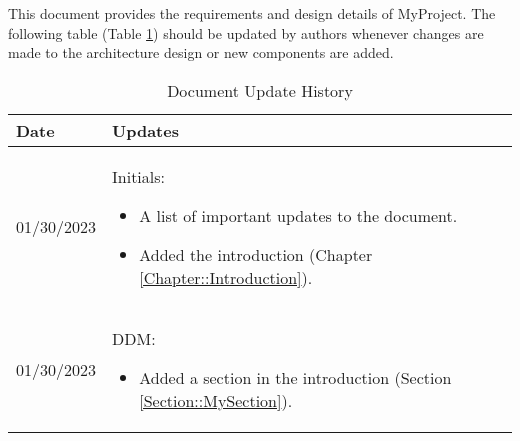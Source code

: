This document provides the requirements and design details of MyProject.  
The following table (Table \ref{Table::UpdateHistory}) should be
updated by authors whenever changes are made to the architecture
design or new components are added.  

\begin{longtable}{|l||p{13.5cm}|}
\caption{Document Update History \label{Table::UpdateHistory}}\\
\hline
\textbf{Date} & \textbf{Updates} \\
\hline 
\endhead

01/30/2023 & Initials:
\begin{itemize}[topsep=0pt,itemsep=0pt,parsep=0pt,partopsep=0pt,leftmargin=12pt]
\item A list of important updates to the document.
\item Added the introduction (Chapter \ref{Chapter::Introduction}). 
\end{itemize} 
\\ \hline

01/30/2023 & DDM:
\begin{itemize}[topsep=0pt,itemsep=0pt,parsep=0pt,partopsep=0pt,leftmargin=12pt]
\item Added a section in the introduction (Section \ref{Section::MySection}).
\end{itemize} 
\\ \hline


\end{longtable}


